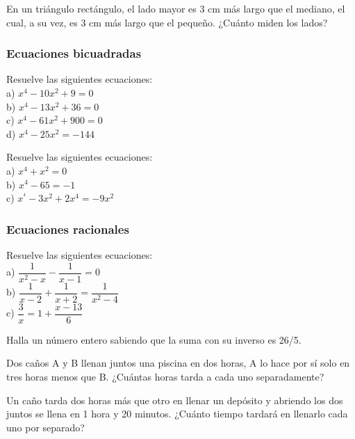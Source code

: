 \begin{ejer}
En un triángulo rectángulo, el lado mayor es 3 cm más largo que el mediano, el cual, a su vez, es 3 cm más largo que el pequeño. ¿Cuánto miden los lados?
\end{ejer}

\subsubsection{Ecuaciones bicuadradas}

\begin{ejer}
Resuelve las siguientes ecuaciones: \\
a) $x^4-10x^2+9=0$ \\
b) $x^4-13x^2+36=0$ \\
c) $x^4-61x^2+900=0$ \\
d) $x^4-25x^2=-144$ \\
\end{ejer}

\begin{ejer}
Resuelve las siguientes ecuaciones: \\
a) $x^4+x^2=0$ \\
b) $x^4-65=-1$ \\
c) $x^^4-3x^2+2x^4=-9x^2$
\end{ejer}

\subsubsection{Ecuaciones racionales}

\begin{ejer}
Resuelve las siguientes ecuaciones: \\
a) $\dfrac{1}{x^2-x}-\dfrac{1}{x-1}=0$ \\
b) $\dfrac{1}{x-2}+\dfrac{1}{x+2}=\dfrac{1}{x^2-4}$ \\
c) $\dfrac{3}{x}=1+\dfrac{x-13}{6}$
\end{ejer}

\begin{ejer}
 Halla un número entero sabiendo que la suma con su inverso es 26/5.
\end{ejer}

\begin{ejer}
Dos caños A y B llenan juntos una piscina en dos horas, A lo hace por sí solo en tres horas menos que B. ¿Cuántas horas tarda a cada uno separadamente?
\end{ejer}

\begin{ejer}
Un caño tarda dos horas más que otro en llenar un depósito y abriendo los dos juntos se llena en 1 hora y 20 minutos. ¿Cuánto tiempo tardará en llenarlo cada uno por separado?
\end{ejer}

